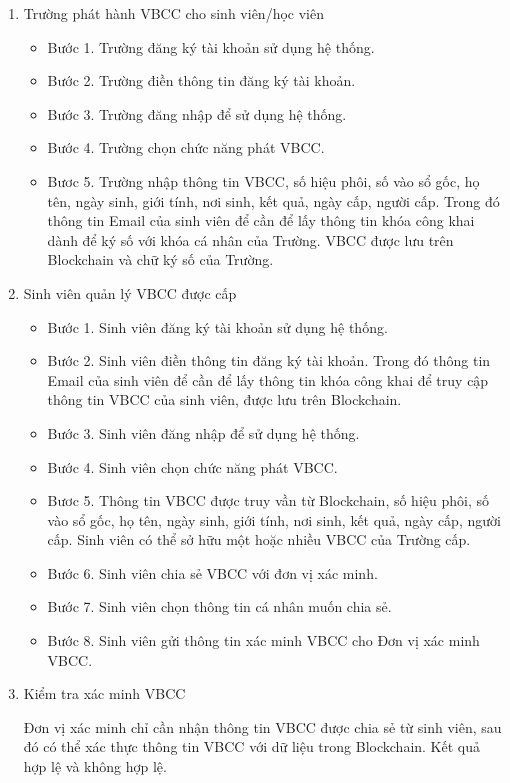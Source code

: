 \begin{enumerate}
\item Trường phát hành VBCC cho sinh viên/học viên

	\begin{itemize}
		\item 
	Bước 1. Trường đăng ký tài khoản sử dụng hệ thống.
\item 
		Bước 2. Trường điền thông tin đăng ký tài khoản.
	\item
		Bước 3. Trường đăng nhập để sử dụng hệ thống.
	\item 
		Bước 4. Trường chọn chức năng phát VBCC.
	\item
		Bươc 5. Trường nhập thông tin VBCC, số hiệu phôi, số vào sổ gốc, họ tên, ngày sinh, giới tính, nơi sinh, kết quả, ngày cấp, người cấp.
		Trong đó thông tin Email của sinh viên để cần để lấy thông tin khóa công khai dành để ký số với khóa cá nhân của Trường. VBCC được lưu trên Blockchain và chữ ký số của Trường.
	\end{itemize}
\item Sinh viên quản lý VBCC được cấp

	\begin{itemize}
		\item 
	Bước 1. Sinh viên đăng ký tài khoản sử dụng hệ thống.
\item 
		Bước 2. Sinh viên điền thông tin đăng ký tài khoản.
		Trong đó thông tin Email của sinh viên để cần để lấy thông tin khóa công khai để truy cập thông tin VBCC của sinh viên, được lưu trên Blockchain.
	\item
		Bước 3. Sinh viên  đăng nhập để sử dụng hệ thống.
	\item 
		Bước 4. Sinh viên chọn chức năng phát VBCC.
	\item
		Bươc 5. Thông tin VBCC được truy vần từ Blockchain, số hiệu phôi, số vào sổ gốc, họ tên, ngày sinh, giới tính, nơi sinh, kết quả, ngày cấp, người cấp. 
Sinh viên có thể sở hữu một hoặc nhiều VBCC của Trường cấp. 
	\item Bước 6. Sinh viên chia sẻ VBCC với đơn vị xác minh. 
	\item Bước 7. Sinh viên chọn thông tin cá nhân muốn chia sẻ.
	\item Bước 8. Sinh viên gửi thông tin xác minh VBCC cho Đơn vị xác minh VBCC.
	\end{itemize}
\item Kiểm tra xác minh VBCC

Đơn vị xác minh chỉ cần nhận thông tin VBCC được chia sẻ từ sinh viên, sau đó có thể xác thực thông tin VBCC với dữ liệu trong Blockchain. Kết quả hợp lệ và không hợp lệ.

\end{enumerate}
